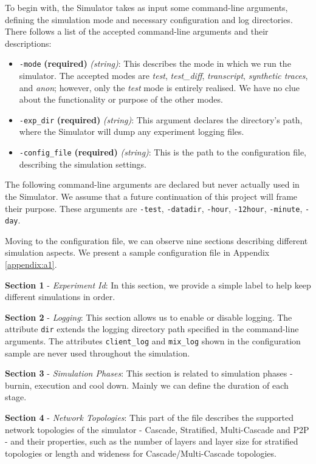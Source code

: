 \documentclass[logo,msc,cyber]{infthesis}   %
\begin{document}
To begin with, the Simulator takes as input some command-line arguments,
defining the simulation mode and necessary configuration and log directories.
There follows a list of the accepted command-line arguments and their
descriptions:

\begin{itemize}
    \item[] \texttt{-mode} \textbf{(required)} \textit{(string)}: This describes
    the mode in which we run the simulator. The accepted modes are \emph{test},
    \emph{test\_diff}, \emph{transcript}, \emph{synthetic traces}, and
    \emph{anon}; however, only the \emph{test} mode is entirely realised. We have no
    clue about the functionality or purpose of the other modes.
    \item[] \texttt{-exp\_dir} \textbf{(required)} \textit{(string)}: This argument
    declares the directory's path, where the Simulator will dump any experiment
    logging files.
    \item[] \texttt{-config\_file} \textbf{(required)} \textit{(string)}: This is
    the path to the configuration file, describing the simulation settings.
 \end{itemize}

The following command-line arguments are declared but never actually used in the
Simulator. We assume that a future continuation of this project will frame their
purpose. These arguments are \texttt{-test}, \texttt{-datadir}, \texttt{-hour},
\texttt{-12hour}, \texttt{-minute}, \texttt{-day}.

Moving to the configuration file, we can observe nine sections describing
different simulation aspects. We present a sample configuration file in Appendix \ref{appendix:a1}.

\textbf{Section 1} - \emph{Experiment Id}: In this section, we provide a simple
label to help keep different simulations in order.
    
\textbf{Section 2} - \emph{Logging}: This section allows us to enable or disable
logging. The attribute \texttt{dir} extends the logging directory path specified
in the command-line arguments. The attributes \texttt{client\_log} and
\texttt{mix\_log} shown in the configuration sample are never used throughout
the simulation.

\textbf{Section 3} - \emph{Simulation Phases}:  This section is related to
simulation phases - burnin, execution and cool down. Mainly we can define the
duration of each stage.

\textbf{Section 4} - \emph{Network Topologies}:  This part of the file describes
the supported network topologies of the simulator - Cascade, Stratified,
Multi-Cascade and P2P - and their properties, such as the number of layers and
layer size for stratified topologies or length and wideness for
Cascade/Multi-Cascade topologies.
\end{document}
